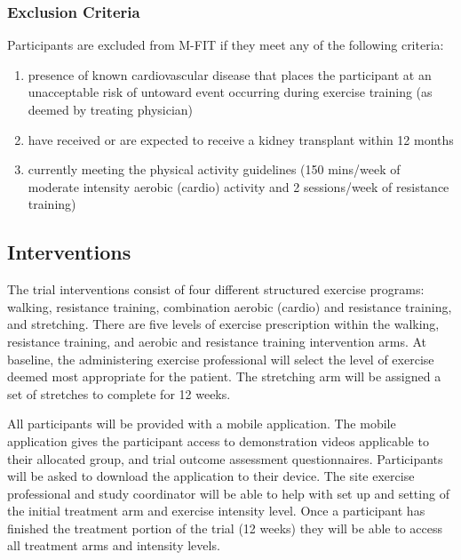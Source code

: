 \documentclass[
]{article}
\providecommand{\tightlist}{%
  \setlength{\itemsep}{0pt}\setlength{\parskip}{0pt}}
\begin{document}
\hypertarget{exclusion-criteria}{
  \subsubsection{Exclusion Criteria}\label{exclusion-criteria}
}

Participants are excluded from M-FIT if they meet any of the following criteria:

\begin{enumerate}
  \def\labelenumi{\arabic{enumi}.}
  \tightlist
  \item presence of known cardiovascular disease that places the participant at an unacceptable risk of untoward event occurring during exercise training (as deemed by treating physician)
  \item have received or are expected to receive a kidney transplant within 12 months
  \item currently meeting the physical activity guidelines (150 mins/week of moderate intensity aerobic (cardio) activity and 2 sessions/week of resistance training)
\end{enumerate}


\hypertarget{interventions}{
  \subsection{Interventions}\label{interventions}
}

The trial interventions consist of four different structured exercise programs: walking, resistance training, combination aerobic (cardio) and resistance training, and stretching.
There are five levels of exercise prescription within the walking, resistance training, and aerobic and resistance training intervention arms.
At baseline, the administering exercise professional will select the level of exercise deemed most appropriate for the patient.
The stretching arm will be assigned a set of stretches to complete for 12 weeks.

All participants will be provided with a mobile application.
The mobile application gives the participant access to demonstration videos applicable to their allocated group, and trial outcome assessment questionnaires.
Participants will be asked to download the application to their device.
The site exercise professional and study coordinator will be able to help with set up and setting of the initial treatment arm and exercise intensity level.
Once a participant has finished the treatment portion of the trial (12 weeks) they will be able to access all treatment arms and intensity levels.
\end{document}
